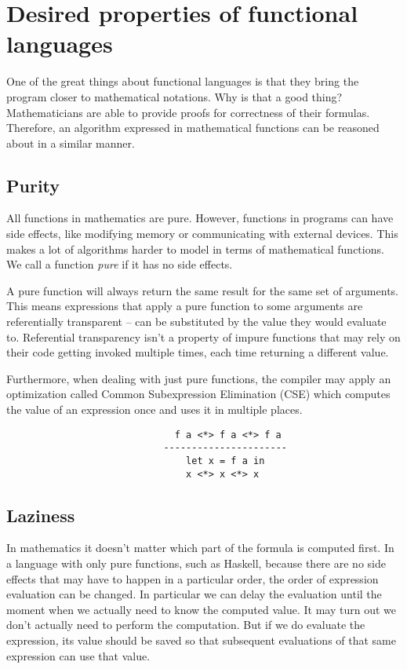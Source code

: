\documentclass[en]{pracamgr}
\begin{document}
\section{Desired properties of functional languages}

One of the great things about functional languages is that
they bring the program closer to mathematical notations.
Why is that a good thing? Mathematicians are able to
provide proofs for correctness of their formulas. Therefore,
an algorithm expressed in mathematical functions can be
reasoned about in a similar manner.

\subsection{Purity}

All functions in mathematics are pure. However, functions
in programs can have side effects, like modifying memory or
communicating with external devices. This makes a lot of
algorithms harder to model in terms of mathematical
functions. We call a function \textit{pure} if it has no
side effects.

A pure function will always return the same result for the
same set of arguments. This means expressions that apply a
pure function to some arguments are referentially
transparent \cite{referentialTransparency} -- can be substituted by the value they would
evaluate to. Referential transparency isn't a property of
impure functions that may rely on their code getting
invoked multiple times, each time returning a different
value.

Furthermore, when dealing with just pure functions, the
compiler may apply an optimization called Common
Subexpression Elimination (CSE) which computes the value of
an expression once and uses it in multiple places.

\begin{verbatim}
                              f a <*> f a <*> f a
                            ----------------------
                                let x = f a in
                                x <*> x <*> x
\end{verbatim}

\subsection{Laziness}\label{s:laziness}

In mathematics it doesn't matter which part of the formula
is computed first. In a language with only pure functions,
such as Haskell, because there are no side effects that may
have to happen in a particular order, the order of
expression evaluation can be changed. In particular we can
delay the evaluation until the moment when we actually need
to know the computed value. It may turn out we don't
actually need to perform the computation. But if we do
evaluate the expression, its value should be saved so that
subsequent evaluations of that same expression can use that value.
\end{document}
